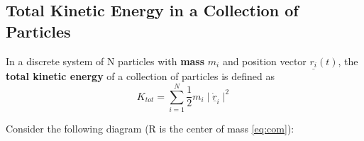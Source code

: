 \subsection{Total Kinetic Energy in a Collection of Particles}
\begin{definition}
	\label{def:total-kinetic-energy}
	In a discrete system of N particles with {\bf mass} $m_i$ and position vector $\underline{r_i}\left(t  \right) $, the {\bf total kinetic energy} of a collection of particles is defined as
	\begin{equation}
		\label{eq:total-kinetic-energy}
		K_{tot} = \sum\limits_{i=1}^{N}\frac{1}{2}m_{i} \mid \underline{\dot{r}}_{i}\mid ^{2}
	\end{equation}
\end{definition}

\clearpage
Consider the following diagram (R is the center of mass \ref{eq:com}):
